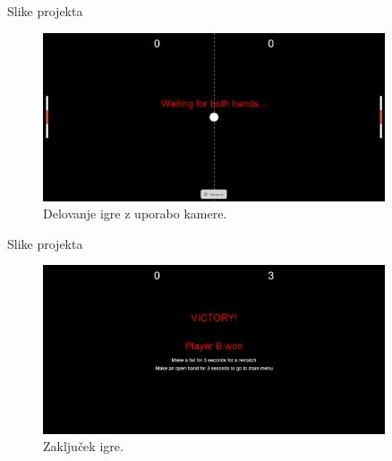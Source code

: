 \documentclass{beamer}
\begin{document}
\begin{frame}{Slike projekta}
  \begin{figure}
      \centering
      \includegraphics[width=0.9\textwidth]{images/startOfGame.png}
      \caption{Delovanje igre z uporabo kamere.}
      \label{fig:camera}
  \end{figure}
\end{frame}


\begin{frame}{Slike projekta}
  \begin{figure}
      \centering
      \includegraphics[width=0.9\textwidth]{images/endOfGame.png}
      \caption{Zaključek igre.}
      \label{fig:camera}
  \end{figure}
\end{frame}
\end{document}

